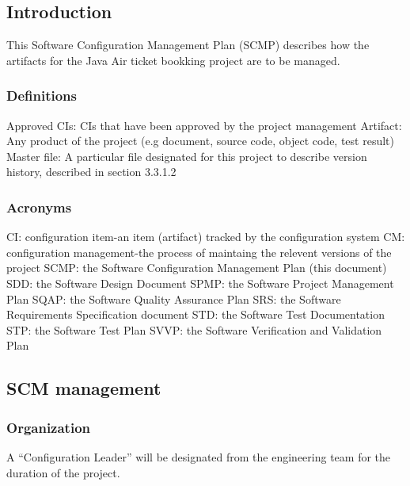 \documentclass{scrartcl}
\begin{document}
\setcounter{secnumdepth}{4}
\setcounter{tocdepth}{4}
\tableofcontents

\newpage
\setcounter{section}{3}
\subsection{Introduction}
This Software Configuration Management Plan (SCMP) describes how the artifacts for the Java Air ticket bookking project are to be managed.
\subsubsection{Definitions}
Approved CIs: CIs that have been approved by the project management \newline
Artifact: Any product of the project (e.g document, source code, object code, test result) \newline
Master file: A particular file designated for this project to describe version history, described in section 3.3.1.2
\subsubsection{Acronyms}
CI: configuration item-an item (artifact) tracked by the configuration system \newline
CM: configuration management-the process of maintaing the relevent versions of the project \newline
SCMP: the Software Configuration Management Plan (this document)\newline
SDD: the Software Design Document \newline
SPMP: the Software Project Management Plan \newline
SQAP: the Software Quality Assurance Plan \newline
SRS: the Software Requirements Specification document \newline
STD: the Software Test Documentation \newline
STP: the Software Test Plan \newline
SVVP: the Software Verification and Validation Plan 
\subsection{SCM management}
\subsubsection{Organization}
A ``Configuration Leader'' will be designated from the engineering team for the duration of the project.
\end{document}
